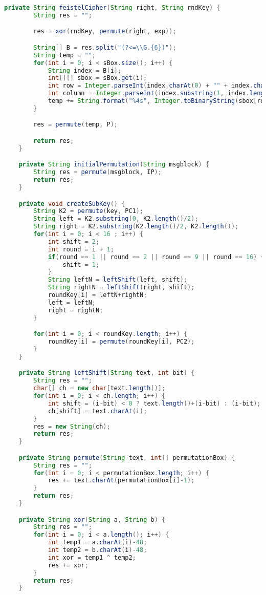 \begin{lstlisting}[language=Java,basicstyle=\tiny,caption=DESDecryption.java]
    private String feistelCipher(String right, String rndKey) {
        String res = "";

        res = xor(rndKey, permute(right, exp));

        String[] B = res.split("(?<=\\G.{6})");
        String temp = "";
        for(int i = 0; i < sBox.size(); i++) {
            String index = B[i];
            int[][] sbox = sBox.get(i);
            int row = Integer.parseInt(index.charAt(0) + "" + index.charAt(index.length()-1) + "",2);
            int column = Integer.parseInt(index.substring(1, index.length()-1), 2);
            temp += String.format("%4s", Integer.toBinaryString(sbox[row][column])).replace(' ', '0');
        }

        res = permute(temp, P);

        return res;
    }

    private String initialPermutation(String msgblock) {
        String res = permute(msgblock, IP);
        return res;
    }

    private void createSubKey() {
        String K2 = permute(key, PC1);
        String left = K2.substring(0, K2.length()/2);
        String right = K2.substring(K2.length()/2, K2.length());
        for(int i = 0; i < 16 ; i++) {
            int shift = 2;
            int round = i + 1;
            if(round == 1 || round == 2 || round == 9 || round == 16) {
                shift = 1;
            }
            String leftN = leftShift(left, shift);
            String rightN = leftShift(right, shift);
            roundKey[i] = leftN+rightN;
            left = leftN;
            right = rightN;
        }

        for(int i = 0; i < roundKey.length; i++) {
            roundKey[i] = permute(roundKey[i], PC2);
        }
    }

    private String leftShift(String text, int bit) {
        String res = "";
        char[] ch = new char[text.length()];
        for(int i = 0; i < ch.length; i++) {
            int shift = (i-bit) < 0 ? text.length()+(i-bit) : (i-bit);
            ch[shift] = text.charAt(i);
        }
        res = new String(ch);
        return res;
    }

    private String permute(String text, int[] permutationBox) {
        String res = "";
        for(int i = 0; i < permutationBox.length; i++) {
            res += text.charAt(permutationBox[i]-1);
        }
        return res;
    }

    private String xor(String a, String b) {
        String res = "";
        for(int i = 0; i < a.length(); i++) {
            int temp1 = a.charAt(i)-48;
            int temp2 = b.charAt(i)-48;
            int xor = temp1 ^ temp2;
            res += xor;
        }
        return res;
    }


\end{lstlisting}
